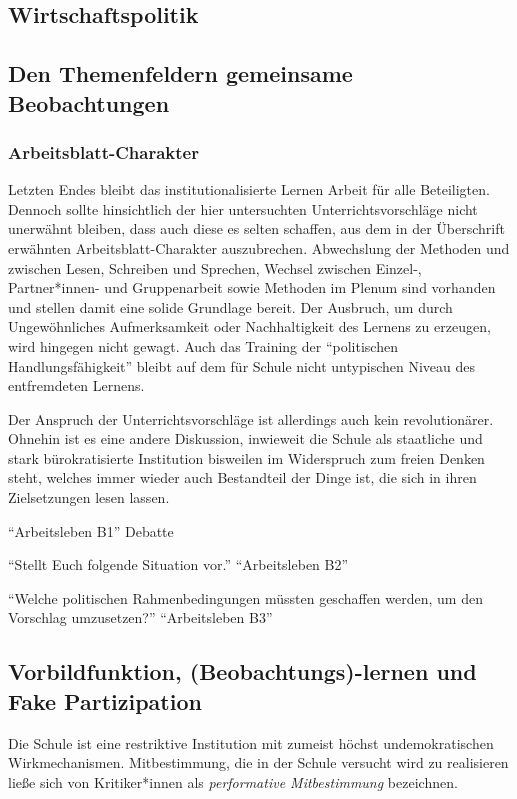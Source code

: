 \subsection{Wirtschaftspolitik} %





\subsection{Den Themenfeldern gemeinsame Beobachtungen}


\subsubsection{Arbeitsblatt-Charakter}
Letzten Endes bleibt das institutionalisierte Lernen Arbeit für alle Beteiligten. Dennoch sollte hinsichtlich der hier untersuchten Unterrichtsvorschläge nicht unerwähnt bleiben, dass auch diese es selten schaffen, aus dem in der Überschrift erwähnten Arbeitsblatt-Charakter auszubrechen. Abwechslung der Methoden und zwischen Lesen, Schreiben und Sprechen, Wechsel zwischen Einzel-, Partner*innen- und Gruppenarbeit sowie Methoden im Plenum sind vorhanden und stellen damit eine solide Grundlage bereit. Der Ausbruch, um durch Ungewöhnliches Aufmerksamkeit oder Nachhaltigkeit des Lernens zu erzeugen, wird hingegen nicht gewagt. 
Auch das Training der \enquote{politischen Handlungsfähigkeit} bleibt auf dem für Schule nicht untypischen Niveau des entfremdeten Lernens. 

Der Anspruch der Unterrichtsvorschläge ist allerdings auch kein revolutionärer. Ohnehin ist es eine andere Diskussion, inwieweit die Schule als staatliche und stark bürokratisierte Institution bisweilen im Widerspruch zum freien Denken steht, welches immer wieder auch Bestandteil der Dinge ist, die sich in ihren Zielsetzungen lesen lassen. 

\enquote{Arbeitsleben B1} Debatte

\enquote{Stellt Euch folgende Situation vor.} \enquote{Arbeitsleben B2}

\enquote{Welche politischen Rahmenbedingungen müssten geschaffen werden, um den Vorschlag umzusetzen?} \enquote{Arbeitsleben B3}

\subsection{Vorbildfunktion, (Beobachtungs)-lernen und Fake Partizipation \label{fakePartizipation}}
Die Schule ist eine restriktive Institution mit zumeist höchst undemokratischen Wirkmechanismen.
Mitbestimmung, die in der Schule versucht wird zu realisieren ließe sich von Kritiker*innen als \emph{performative Mitbestimmung} bezeichnen. 


